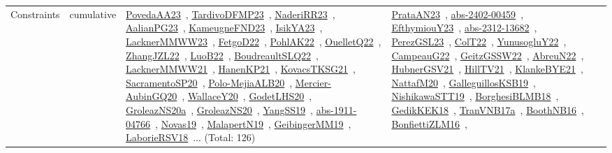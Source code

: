 {\begin{longtable}{lp{3cm}>{\raggedright\arraybackslash}p{6cm}>{\raggedright\arraybackslash}p{6cm}>{\raggedright\arraybackslash}p{8cm}}
Constraints & cumulative & \href{works/PovedaAA23.pdf}{PovedaAA23}~\cite{PovedaAA23}, \href{works/TardivoDFMP23.pdf}{TardivoDFMP23}~\cite{TardivoDFMP23}, \href{works/NaderiRR23.pdf}{NaderiRR23}~\cite{NaderiRR23}, \href{works/AalianPG23.pdf}{AalianPG23}~\cite{AalianPG23}, \href{works/KameugneFND23.pdf}{KameugneFND23}~\cite{KameugneFND23}, \href{works/IsikYA23.pdf}{IsikYA23}~\cite{IsikYA23}, \href{works/LacknerMMWW23.pdf}{LacknerMMWW23}~\cite{LacknerMMWW23}, \href{works/FetgoD22.pdf}{FetgoD22}~\cite{FetgoD22}, \href{works/PohlAK22.pdf}{PohlAK22}~\cite{PohlAK22}, \href{works/OuelletQ22.pdf}{OuelletQ22}~\cite{OuelletQ22}, \href{works/ZhangJZL22.pdf}{ZhangJZL22}~\cite{ZhangJZL22}, \href{works/LuoB22.pdf}{LuoB22}~\cite{LuoB22}, \href{works/BoudreaultSLQ22.pdf}{BoudreaultSLQ22}~\cite{BoudreaultSLQ22}, \href{works/LacknerMMWW21.pdf}{LacknerMMWW21}~\cite{LacknerMMWW21}, \href{works/HanenKP21.pdf}{HanenKP21}~\cite{HanenKP21}, \href{works/KovacsTKSG21.pdf}{KovacsTKSG21}~\cite{KovacsTKSG21}, \href{works/SacramentoSP20.pdf}{SacramentoSP20}~\cite{SacramentoSP20}, \href{works/Polo-MejiaALB20.pdf}{Polo-MejiaALB20}~\cite{Polo-MejiaALB20}, \href{works/Mercier-AubinGQ20.pdf}{Mercier-AubinGQ20}~\cite{Mercier-AubinGQ20}, \href{works/WallaceY20.pdf}{WallaceY20}~\cite{WallaceY20}, \href{works/GodetLHS20.pdf}{GodetLHS20}~\cite{GodetLHS20}, \href{works/GroleazNS20a.pdf}{GroleazNS20a}~\cite{GroleazNS20a}, \href{works/GroleazNS20.pdf}{GroleazNS20}~\cite{GroleazNS20}, \href{works/YangSS19.pdf}{YangSS19}~\cite{YangSS19}, \href{works/abs-1911-04766.pdf}{abs-1911-04766}~\cite{abs-1911-04766}, \href{works/Novas19.pdf}{Novas19}~\cite{Novas19}, \href{works/MalapertN19.pdf}{MalapertN19}~\cite{MalapertN19}, \href{works/GeibingerMM19.pdf}{GeibingerMM19}~\cite{GeibingerMM19}, \href{works/LaborieRSV18.pdf}{LaborieRSV18}~\cite{LaborieRSV18}... (Total: 126) & \href{works/PrataAN23.pdf}{PrataAN23}~\cite{PrataAN23}, \href{works/abs-2402-00459.pdf}{abs-2402-00459}~\cite{abs-2402-00459}, \href{works/EfthymiouY23.pdf}{EfthymiouY23}~\cite{EfthymiouY23}, \href{works/abs-2312-13682.pdf}{abs-2312-13682}~\cite{abs-2312-13682}, \href{works/PerezGSL23.pdf}{PerezGSL23}~\cite{PerezGSL23}, \href{works/ColT22.pdf}{ColT22}~\cite{ColT22}, \href{works/YunusogluY22.pdf}{YunusogluY22}~\cite{YunusogluY22}, \href{works/CampeauG22.pdf}{CampeauG22}~\cite{CampeauG22}, \href{works/GeitzGSSW22.pdf}{GeitzGSSW22}~\cite{GeitzGSSW22}, \href{works/AbreuN22.pdf}{AbreuN22}~\cite{AbreuN22}, \href{works/HubnerGSV21.pdf}{HubnerGSV21}~\cite{HubnerGSV21}, \href{works/HillTV21.pdf}{HillTV21}~\cite{HillTV21}, \href{works/KlankeBYE21.pdf}{KlankeBYE21}~\cite{KlankeBYE21}, \href{works/NattafM20.pdf}{NattafM20}~\cite{NattafM20}, \href{works/GalleguillosKSB19.pdf}{GalleguillosKSB19}~\cite{GalleguillosKSB19}, \href{works/NishikawaSTT19.pdf}{NishikawaSTT19}~\cite{NishikawaSTT19}, \href{works/BorghesiBLMB18.pdf}{BorghesiBLMB18}~\cite{BorghesiBLMB18}, \href{works/GedikKEK18.pdf}{GedikKEK18}~\cite{GedikKEK18}, \href{works/TranVNB17a.pdf}{TranVNB17a}~\cite{TranVNB17a}, \href{works/BoothNB16.pdf}{BoothNB16}~\cite{BoothNB16}, \href{works/BonfiettiZLM16.pdf}{BonfiettiZLM16}~\cite{BonfiettiZLM16}, 
\end{longtable}}
